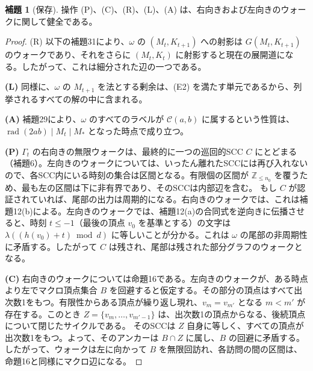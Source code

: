 \documentclass[11pt,reqno]{amsart}
\theoremstyle{definition}
\newtheorem{lemma}[theorem]{補題}
\theoremstyle{definition}
\theoremstyle{remark}
\begin{document}
\begin{samepage}
\begin{lemma}[保存]\leavevmode\label{thm:30}
操作 (P)、(C)、(R)、(L)、(A) は、右向きおよび左向きのウォークに関して健全である。
\label{thm-end:30}
\end{lemma}
\end{samepage}

\begin{proof}\leavevmode\label{proof:30}
(R) 以下の補題31により、\(\omega\) の \((M_t,K_{t+1})\) への射影は \(G(M_t,K_{t+1})\) のウォークであり、それをさらに \((M_t,K_t)\) に射影すると現在の展開道になる。したがって、これは細分された辺の一つである。

\textbf{(L)} 同様に、\(\omega\) の \(M_{t+1}\) を法とする剰余は、(E2) を満たす単元であるから、列挙されるすべての解の中に含まれる。

\textbf{(A)} 補題29により、\(\omega\) のすべてのラベルが \(\mathcal C(a,b)\) に属するという性質は、\(\operatorname{rad}(2ab)\mid M_t\mid M_*\) となった時点で成り立つ。

\textbf{(P)} \(\Gamma_t\) の右向きの無限ウォークは、最終的に一つの巡回的SCC \(C\) にとどまる（補題6）。左向きのウォークについては、いったん離れたSCCには再び入れないので、各SCC内にいる時刻の集合は区間となる。有限個の区間が \(\mathbb Z_{\le n_0}\) を覆うため、最も左の区間は下に非有界であり、そのSCCは内部辺を含む。
もし \(C\) が認証されていれば、尾部の出力は周期的になる。右向きのウォークでは、これは補題12(b)による。左向きのウォークでは、補題12(a)の合同式を逆向きに伝播させると、時刻 \(t\le-1\)（最後の頂点 \(v_0\) を基準とする）の文字は \(\lambda((h(v_0)+t)\bmod d)\) に等しいことが分かる。これは \(\omega\) の尾部の非周期性に矛盾する。したがって \(C\) は残され、尾部は残された部分グラフのウォークとなる。

\textbf{(C)} 右向きのウォークについては命題16である。左向きのウォークが、ある時点より左でマクロ頂点集合 \(B\) を回避すると仮定する。その部分の頂点はすべて出次数1をもつ。有限性からある頂点が繰り返し現れ、\(v_m=v_{m'}\) となる \(m<m'\) が存在する。このとき \(Z=\{v_m,\ldots,v_{m'-1}\}\) は、出次数1の頂点からなる、後続頂点について閉じたサイクルである。
そのSCCは \(Z\) 自身に等しく、すべての頂点が出次数1をもつ。よって、そのアンカーは \(B\cap Z\) に属し、\(B\) の回避に矛盾する。したがって、ウォークは左に向かって \(B\) を無限回訪れ、各訪問の間の区間は、命題16と同様にマクロ辺になる。\qedhere
\end{proof}
\end{document}

